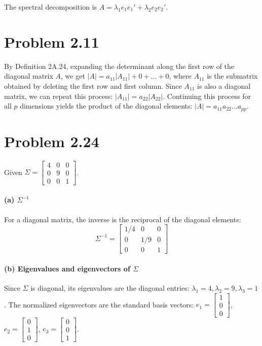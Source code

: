 \documentclass[12pt]{article}
\begin{document}
The spectral decomposition is $A = \lambda_1 e_1 e_1' + \lambda_2 e_2 e_2'$. 

\section*{Problem 2.11} 
By Definition 2A.24, expanding the determinant along the first row of the diagonal matrix $A$, we get $|A| = a_{11}|A_{11}| + 0 + \dots + 0$, where $A_{11}$ is the submatrix obtained by deleting the first row and first column. 
Since $A_{11}$ is also a diagonal matrix, we can repeat this process: $|A_{11}| = a_{22}|A_{22}|$. 
Continuing this process for all $p$ dimensions yields the product of the diagonal elements: $|A| = a_{11}a_{22}\dots a_{pp}$. 

\section*{Problem 2.24} 
Given $\Sigma = \begin{bmatrix} 4 & 0 & 0 \\ 0 & 9 & 0 \\ 0 & 0 & 1 \end{bmatrix}$. 

\paragraph{(a) $\Sigma^{-1}$} 
For a diagonal matrix, the inverse is the reciprocal of the diagonal elements: 
\[ \Sigma^{-1} = \begin{bmatrix} 1/4 & 0 & 0 \\ 0 & 1/9 & 0 \\ 0 & 0 & 1 \end{bmatrix} \] 

\paragraph{(b) Eigenvalues and eigenvectors of $\Sigma$} 
Since $\Sigma$ is diagonal, its eigenvalues are the diagonal entries: $\lambda_1=4, \lambda_2=9, \lambda_3=1$. 
The normalized eigenvectors are the standard basis vectors: $e_1=\begin{bmatrix} 1 \\ 0 \\ 0 \end{bmatrix}$, $e_2=\begin{bmatrix} 0 \\ 1 \\ 0 \end{bmatrix}$, $e_3=\begin{bmatrix} 0 \\ 0 \\ 1 \end{bmatrix}$. 
\end{document}
